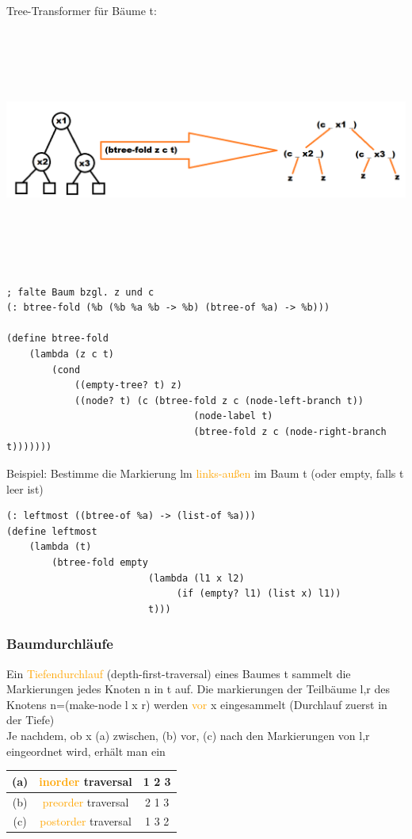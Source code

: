 \documentclass[paper=a4, fontsize=11pt]{scrartcl}
\numberwithin{equation}{section}
\numberwithin{figure}{section}
\numberwithin{table}{section}
\begin{document}
\begin{lstlistig}
Tree-Transformer für Bäume t:

\includegraphics[width=15cm,height=8cm]{btree-fold.png}

\begin{lstlisting}
; falte Baum bzgl. z und c
(: btree-fold (%b (%b %a %b -> %b) (btree-of %a) -> %b)))

(define btree-fold
    (lambda (z c t)
        (cond
            ((empty-tree? t) z)
            ((node? t) (c (btree-fold z c (node-left-branch t))
                                 (node-label t)
                                 (btree-fold z c (node-right-branch t)))))))
\end{lstlisting}

Beispiel: Bestimme die Markierung lm \textcolor{orange}{links-außen} im Baum t (oder empty, falls t leer ist) \\


\begin{lstlisting}
(: leftmost ((btree-of %a) -> (list-of %a)))
(define leftmost
    (lambda (t)
        (btree-fold empty
                         (lambda (l1 x l2)
                              (if (empty? l1) (list x) l1))
                         t)))     
\end{lstlisting}
\subsubsection{Baumdurchläufe}
Ein \textcolor{orange}{Tiefendurchlauf} (depth-first-traversal) eines Baumes t sammelt die Markierungen jedes Knoten n in t auf. Die markierungen der Teilbäume l,r des Knotens n=(make-node l x r) werden \textcolor{orange}{vor} x eingesammelt (Durchlauf zuerst in der Tiefe) \\
Je nachdem, ob x (a) zwischen, (b) vor, (c) nach den Markierungen von l,r eingeordnet wird, erhält man ein \\
\begin{tabular}{|c|c|c|}
\hline
(a) & \textcolor{orange}{inorder} traversal & 1 2 3 \\\hline
(b) & \textcolor{orange}{preorder} traversal & 2 1 3 \\\hline
(c) & \textcolor{orange}{postorder} traversal & 1 3 2 \\\hline
\end{tabular}


\end{lstlistig}
\end{document}
